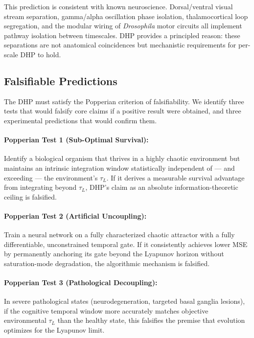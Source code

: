 \documentclass[12pt]{article}
\begin{document}
This prediction is consistent with known neuroscience. Dorsal/ventral visual stream
separation, gamma/alpha oscillation phase isolation, thalamocortical loop segregation, and
the modular wiring of \textit{Drosophila} motor circuits all implement pathway isolation
between timescales. DHP provides a principled reason: these separations are not anatomical
coincidences but mechanistic requirements for per-scale DHP to hold.

\subsection{Falsifiable Predictions}

The DHP must satisfy the Popperian criterion of falsifiability. We identify three tests
that would falsify core claims if a positive result were obtained, and three experimental
predictions that would confirm them.

\paragraph{Popperian Test 1 (Sub-Optimal Survival):} Identify a biological organism that
thrives in a highly chaotic environment but maintains an intrinsic integration window
statistically independent of --- and exceeding --- the environment's $\tau_L$. If it derives
a measurable survival advantage from integrating beyond $\tau_L$, DHP's claim as an absolute
information-theoretic ceiling is falsified.

\paragraph{Popperian Test 2 (Artificial Uncoupling):} Train a neural network on a fully
characterized chaotic attractor with a fully differentiable, unconstrained temporal gate.
If it consistently achieves lower MSE by permanently anchoring its gate beyond the Lyapunov
horizon without saturation-mode degradation, the algorithmic mechanism is falsified.

\paragraph{Popperian Test 3 (Pathological Decoupling):} In severe pathological states
(neurodegeneration, targeted basal ganglia lesions), if the cognitive temporal window more
accurately matches objective environmental $\tau_L$ than the healthy state, this falsifies
the premise that evolution optimizes for the Lyapunov limit.
\end{document}
